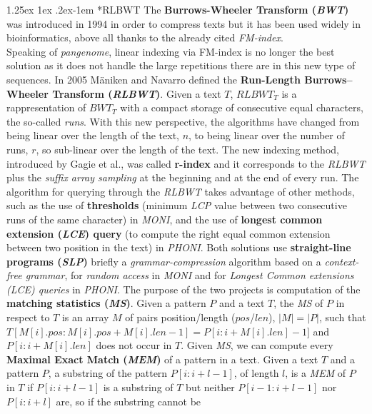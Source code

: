 \documentclass[a4paper,11pt, oneside]{article}
\makeatletter
\renewcommand{\paragraph}{%
  \@startsection{paragraph}{4}%
  {\z@}{1.25ex \@plus 1ex \@minus .2ex}{-1em}%
  {\normalfont\normalsize\bfseries}%
}
\makeatother
\begin{document}
\paragraph*{RLBWT}
The \textbf{Burrows-Wheeler Transform (\textit{BWT})} was introduced
in 1994 in order to compress texts but it has been used widely
in bioinformatics, above all thanks to the already cited
\textit{FM-index}.\\
Speaking of \textit{pangenome}, linear indexing via FM-index is no longer the
best solution as it does not handle the large repetitions there are in this new
type of sequences. In 2005 M\"{a}niken and Navarro defined 
the \textbf{Run-Length Burrows–Wheeler Transform (\textit{RLBWT})}. Given a text
$T$, $RLBWT_T$ is a rappresentation of $BWT_T$ with a compact storage of
consecutive equal characters, the so-called \textit{runs}. With this new
perspective, the algorithms have changed from being linear over the length of
the text, $n$, to being linear over the number of runs, $r$, so sub-linear over
the length of the text. The new indexing method, introduced by Gagie et al., was
called \textbf{r-index} 
and it corresponds to the \textit{RLBWT} plus the \textit{suffix array sampling}
at the beginning and at the end of every run. The algorithm for querying through
the \textit{RLBWT} takes advantage of other methods, such as the use of
\textbf{thresholds} (minimum \textit{LCP} value between two consecutive runs of
the same character) in \textit{MONI}, and the use of \textbf{longest common
  extension (\textit{LCE}) query} (to compute the right equal common extension
between two position in the text) in \textit{PHONI}. Both solutions use
\textbf{straight-line programs (\textit{SLP})} briefly a
\textit{grammar-compression} algorithm based on a \textit{context-free grammar},
for \textit{random access} in \textit{MONI} and for \textit{Longest Common
  extensions (LCE) queries} in \textit{PHONI}. 
The purpose of the two projects is computation of the \textbf{matching
  statistics (\textit{MS})}. Given a pattern $P$ and a text $T$, the \textit{MS}
of $P$ in respect to $T$ is an array $M$ of pairs position/length ($pos$/$len$),
$|M|=|P|$, such that $T[M[i].pos:M[i].pos+M[i].len-1]=P[i:i+M[i].len]-1]$ and
$P[i:i+M[i].len]$ does not occur in $T$. Given \textit{MS}, we can compute every
\textbf{Maximal Exact Match (\textit{MEM})} of a pattern in a text. Given a
text $T$ and a pattern $P$, a substring of the pattern $P[i : i+l-1]$, of length
$l$, is a \textit{MEM} of $P$ in $T$ if $P[i:i+l-1]$ is a substring of $T$ but
neither $P[i-1:i+l-1]$ nor $P[i:i+l]$ are, so if the substring cannot be
\end{document}
